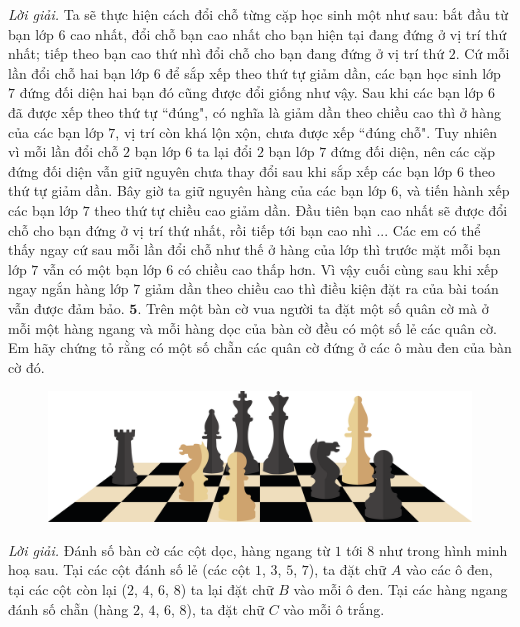 \begin{multicols}{2}
\begin{figure}[H]
	\end{figure}
	\textit{Lời giải.} Ta sẽ thực hiện cách đổi chỗ từng cặp học sinh một  như sau: bắt đầu từ bạn lớp $6$ cao nhất, đổi chỗ bạn cao nhất cho bạn hiện tại đang đứng ở vị trí thứ nhất; tiếp theo bạn cao thứ nhì đổi chỗ cho bạn đang đứng ở vị trí thứ $2$.  Cứ mỗi lần đổi chỗ hai bạn lớp $6$ để sắp xếp theo thứ tự giảm dần, các bạn học sinh lớp $7$ đứng đối diện hai bạn đó cũng được đổi giống như vậy. Sau khi các bạn lớp $6$ đã được xếp theo thứ tự ``đúng", có nghĩa là giảm dần theo chiều cao thì ở hàng của các bạn lớp $7$, vị trí còn khá lộn xộn, chưa được xếp ``đúng chỗ". Tuy nhiên vì mỗi lần đổi chỗ $2$ bạn lớp $6$ ta lại đổi $2$ bạn lớp $7$ đứng đối diện, nên các cặp đứng đối diện vẫn giữ nguyên chưa thay đổi sau khi sắp xếp các bạn lớp $6$ theo thứ tự giảm dần.
	\vskip 0.1cm
	Bây giờ ta giữ nguyên hàng của các bạn lớp $6$, và tiến hành xếp các bạn lớp $7$ theo thứ tự chiều cao giảm dần. Đầu tiên bạn cao nhất sẽ được đổi chỗ cho bạn đứng ở vị trí thứ nhất, rồi tiếp tới bạn cao nhì ... Các em có thể thấy ngay cứ sau mỗi lần đổi chỗ như thế ở hàng của lớp  thì trước mặt mỗi bạn lớp $7$ vẫn có một bạn lớp $6$ có chiều cao thấp hơn. Vì vậy cuối cùng sau khi xếp ngay ngắn hàng lớp $7$ giảm dần theo chiều cao thì điều kiện đặt ra của bài toán vẫn được đảm bảo.
	\vskip 0.1cm
	$\pmb{5.}$	Trên một bàn cờ vua người ta đặt một số quân cờ mà ở  mỗi một hàng ngang và mỗi hàng dọc của bàn cờ đều có một số lẻ các quân cờ. Em hãy chứng tỏ rằng có một số chẵn các quân cờ đứng ở các ô màu đen của bàn cờ đó.
	\begin{figure}[H]
		\vspace*{-5pt}
		\centering
		\captionsetup{labelformat= empty, justification=centering}
		\includegraphics[width= 1\linewidth]{b2}
		\vspace*{-15pt}
	\end{figure}
	\textit{Lời giải.} Đánh số bàn cờ các cột dọc, hàng ngang từ $1$ tới $8$ như trong hình minh hoạ sau. Tại các cột đánh số lẻ (các cột $1$, $3$, $5$, $7$), ta đặt chữ $A$ vào các ô đen, tại các cột còn lại ($2$, $4$, $6$, $8$) ta lại đặt chữ $B$ vào mỗi ô đen. Tại các hàng ngang đánh số chẵn (hàng $2$, $4$, $6$, $8$), ta đặt chữ $C$ vào mỗi ô trắng.

\end{multicols}
